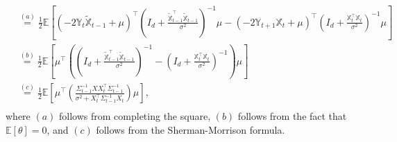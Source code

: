 \documentclass[twoside,11pt]{article}
\renewenvironment{proof}{\par\noindent{\bf Proof\ }}{\hfill\BlackBox\\[2mm]}
\newenvironment{proof}{\par\noindent{\bf Proof\ }}{\hfill\BlackBox\\[2mm]}
\def\E{\mathbb{E}}
\begin{document}
\begin{proof}
\begin{align*}
        & \overset{(a)}{=} \frac{1}{2}\E\left[\left(-2\mathbb{Y}_{t}\tilde{\mathbb{X}}_{t-1} + \mu\right)^\top\left(I_d + \frac{\tilde{\mathbb{X}}_{t-1}^\top\tilde{\mathbb{X}}_{t-1}}{\sigma^2}\right)^{-1}\mu - \left(-2\mathbb{Y}_{t+1}\mathbb{X}_{t} + \mu\right)^\top\left(I_d + \frac{\mathbb{X}_{t}^\top\mathbb{X}_{t}}{\sigma^2}\right)^{-1}\mu\right]\\
        & \overset{(b)}{=} \frac{1}{2}\E\left[\mu^\top \left(\left(I_d + \frac{\tilde{\mathbb{X}}_{t-1}^\top\tilde{\mathbb{X}}_{t-1}}{\sigma^2}\right)^{-1}- \left(I_d + \frac{\mathbb{X}_t^\top\mathbb{X}_t}{\sigma^2}\right)^{-1}\right)\mu\right] \\
        & \overset{(c)}{=} \frac{1}{2}\E\left[\mu^\top\left(\frac{\Sigma^{-1}_{t-1}XX_t^\top\Sigma^{-1}_{t-1}}{\sigma^2 + X_t^\top \Sigma^{-1}_{t-1} X_t}\right)\mu\right],\\
    \end{align*}
    where $(a)$ follows from completing the square, $(b)$ follows from the fact that $\E[\theta] = 0$, and $(c)$ follows from the Sherman-Morrison formula.
\end{proof}
\end{document}
